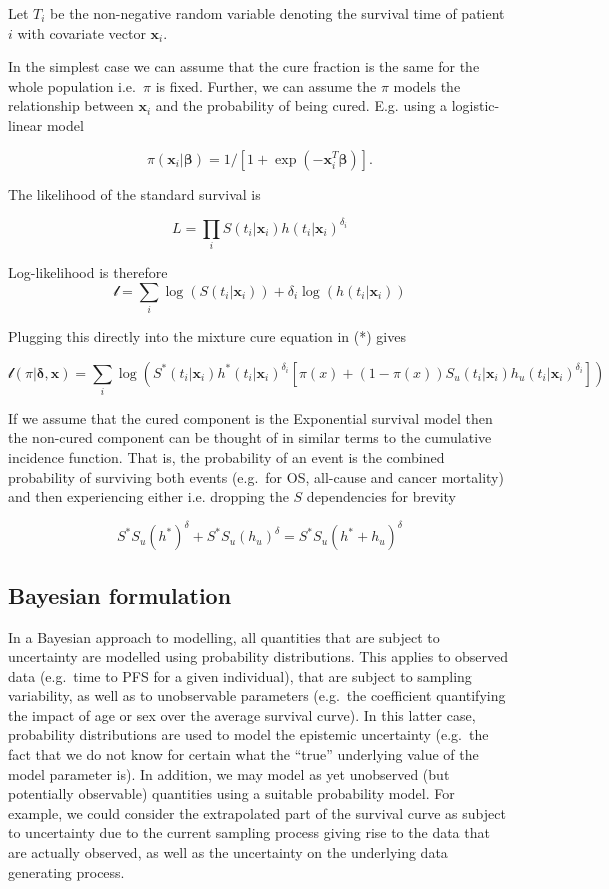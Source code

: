 \documentclass[
]{article}
\begin{document}
Let \(T_i\) be the non-negative random variable denoting the survival
time of patient \(i\) with covariate vector \(\boldsymbol{x}_i\).

In the simplest case we can assume that the cure fraction is the same
for the whole population i.e.~\(\pi\) is fixed. Further, we can assume
the \(\pi\) models the relationship between \(\boldsymbol{x}_i\) and the
probability of being cured. E.g. using a logistic-linear model

\[
\pi(\boldsymbol{x}_i | \boldsymbol{\beta}) = 1/[1 + \exp(-\boldsymbol{x}_i^T \boldsymbol{\beta})].
\]

The likelihood of the standard survival is

\[
L = \prod_i S(t_i | \boldsymbol{x}_i) h(t_i | \boldsymbol{x}_i)^{\delta_i}
\]

Log-likelihood is therefore \[
\mathcal{l} = \sum_i \log(S(t_i | \boldsymbol{x}_i)) + \delta_i \log(h(t_i | \boldsymbol{x}_i))
\]

Plugging this directly into the mixture cure equation in (*) gives

\[
\mathcal{l}(\pi | \boldsymbol{\delta}, \boldsymbol{x}) =
 \sum_i \log(S^*(t_i | \boldsymbol{x}_i) h^*(t_i | \boldsymbol{x}_i)^{\delta_i}[\pi(x) +
   (1 − \pi(x)) S_u(t_i | \boldsymbol{x}_i) h_u(t_i | \boldsymbol{x}_i)^{\delta_i}])
\]

If we assume that the cured component is the Exponential survival model
then the non-cured component can be thought of in similar terms to the
cumulative incidence function. That is, the probability of an event is
the combined probability of surviving both events (e.g.~for OS,
all-cause and cancer mortality) and then experiencing either i.e.
dropping the \(S\) dependencies for brevity

\begin{equation}
\tag{**}
S^* S_u (h^*)^{\delta} + S^* S_u (h_u)^{\delta} = S^* S_u (h^* + h_u)^{\delta}
\end{equation}

\hypertarget{bayesian-formulation}{%
\subsection{Bayesian formulation}\label{bayesian-formulation}}

In a Bayesian approach to modelling, all quantities that are subject to
uncertainty are modelled using probability distributions. This applies
to observed data (e.g.~time to PFS for a given individual), that are
subject to sampling variability, as well as to unobservable parameters
(e.g.~the coefficient quantifying the impact of age or sex over the
average survival curve). In this latter case, probability distributions
are used to model the epistemic uncertainty (e.g.~the fact that we do
not know for certain what the ``true'' underlying value of the model
parameter is). In addition, we may model as yet unobserved (but
potentially observable) quantities using a suitable probability model.
For example, we could consider the extrapolated part of the survival
curve as subject to uncertainty due to the current sampling process
giving rise to the data that are actually observed, as well as the
uncertainty on the underlying data generating process.
\end{document}
